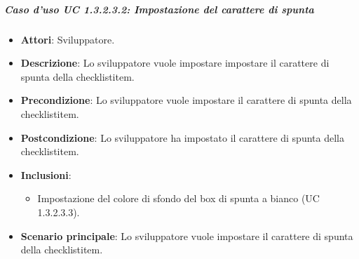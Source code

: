 \subparagraph{Caso d'uso UC 1.3.2.3.2: Impostazione del carattere di spunta}

\FloatBarrier
\begin{itemize}
\item\textbf{Attori}: Sviluppatore.
\item\textbf{Descrizione}: Lo sviluppatore vuole impostare impostare il carattere di spunta della checklistitem.
\item\textbf{Precondizione}: Lo sviluppatore vuole impostare il carattere di spunta della checklistitem.
\item\textbf{Postcondizione}: Lo sviluppatore ha impostato il carattere di spunta della checklistitem.
\item \textbf{Inclusioni}: 
\begin{itemize}
\item Impostazione del colore di sfondo del box di spunta a bianco (UC 1.3.2.3.3).
\end{itemize}
\item\textbf{Scenario principale}: Lo sviluppatore vuole impostare il carattere di spunta della checklistitem.
\end{itemize}
